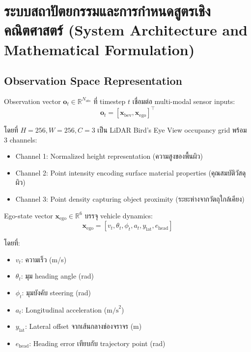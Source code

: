 \documentclass[10pt,a4paper,twocolumn]{article}
\begin{document}
\section{ระบบสถาปัตยกรรมและการกำหนดสูตรเชิงคณิตศาสตร์ (System Architecture and Mathematical Formulation)}

\subsection{Observation Space Representation}

Observation vector $\mathbf{o}_t \in \mathbb{R}^{N_{obs}}$ ที่ timestep $t$ เชื่อมต่อ multi-modal sensor inputs:
\begin{equation}\label{eq:observation-space}
    \mathbf{o}_t = [\mathbf{x}_{\text{bev}}, \mathbf{x}_{\text{ego}}]^{\top}
\end{equation}

โดยที่ $H=256, W=256, C=3$ เป็น LiDAR Bird's Eye View occupancy grid พร้อม 3 channels: 
\begin{itemize}
    \item Channel 1: Normalized height representation (ความสูงของพื้นผิว)
    \item Channel 2: Point intensity encoding surface material properties (คุณสมบัติวัสดุผิว)
    \item Channel 3: Point density capturing object proximity (ระยะห่างจากวัตถุใกล้เคียง)
\end{itemize}

Ego-state vector $\mathbf{x}_{\text{ego}} \in \mathbb{R}^{6}$ บรรจุ vehicle dynamics:
\begin{equation}\label{eq:ego-state}
    \mathbf{x}_{\text{ego}} = [v_t, \theta_t, \phi_t, a_t, y_{\text{lat}}, e_{\text{head}}]
\end{equation}

โดยที่:
\begin{itemize}
    \item $v_t$: ความเร็ว (m/s)
    \item $\theta_t$: มุม heading angle (rad)
    \item $\phi_t$: มุมบังคับ steering (rad)
    \item $a_t$: Longitudinal acceleration ($\text{m/s}^2$)
    \item $y_{\text{lat}}$: Lateral offset จากเส้นกลางช่องจราจร (m)
    \item $e_{\text{head}}$: Heading error เทียบกับ trajectory point (rad)
\end{itemize}
\end{document}
